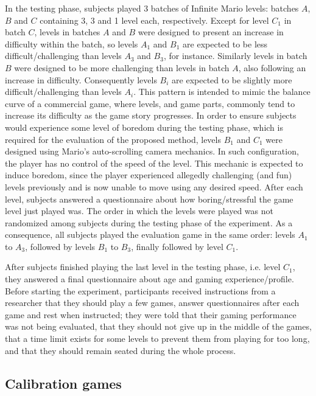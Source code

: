 In the testing phase, subjects played 3 batches of Infinite Mario levels: batches $A$, $B$ and $C$ containing 3, 3 and 1 level each, respectively. Except for level $C_1$ in batch $C$, levels in batches $A$ and $B$ were designed to present an increase in difficulty within the batch, so levels $A_1$ and $B_1$ are expected to be less difficult/challenging than levels $A_3$ and $B_3$, for instance. Similarly levels in batch $B$ were designed to be more challenging than levels in batch $A$, also following an increase in difficulty. Consequently levels $B_i$ are expected to be slightly more difficult/challenging than levels $A_i$. This pattern is intended to mimic the balance curve of a commercial game, where levels, and game parts, commonly tend to increase its difficulty as the game story progresses. In order to ensure subjects would experience some level of boredom during the testing phase, which is required for the evaluation of the proposed method, levels $B_1$ and $C_1$ were designed using Mario's auto-scrolling camera mechanics. In such configuration, the player has no control of the speed of the level. This mechanic is expected to induce boredom, since the player experienced allegedly challenging (and fun) levels previously and is now unable to move using any desired speed. After each level, subjects answered a questionnaire about how boring/stressful the game level just played was. The order in which the levels were played was not randomized among subjects during the testing phase of the experiment. As a consequence, all subjects played the evaluation game in the same order: levels $A_1$ to $A_3$, followed by levels $B_1$ to $B_3$, finally followed by level $C_1$.

After subjects finished playing the last level in the testing phase, i.e. level $C_1$, they answered a final questionnaire about age and gaming experience/profile. Before starting the experiment, participants received instructions from a researcher that they should play a few games, answer questionnaires after each game and rest when instructed; they were told that their gaming performance was not being evaluated, that they should not give up in the middle of the games, that a time limit exists for some levels to prevent them from playing for too long, and that they should remain seated during the whole process.

\subsection{Calibration games}
\label{sec:experiment2-calibration-games}

